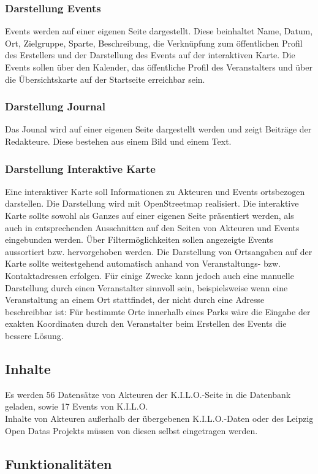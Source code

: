 \documentclass{swp}
\begin{document}
\subsubsection{Darstellung Events}
Events werden auf einer eigenen Seite dargestellt. Diese beinhaltet Name, Datum, Ort, Zielgruppe, Sparte, Beschreibung, die Verkn\"upfung zum \"offentlichen Profil des Erstellers und der Darstellung des Events auf der interaktiven Karte. Die Events sollen \"uber den Kalender, das \"offentliche Profil des Veranstalters und \"uber die \"Ubersichtskarte auf der Startseite erreichbar sein.
\subsubsection{Darstellung Journal}
Das Jounal wird auf einer eigenen Seite dargestellt werden und zeigt Beitr\"age der Redakteure. Diese bestehen aus einem Bild und einem Text.
\subsubsection{Darstellung Interaktive Karte}
Eine interaktiver Karte soll Informationen zu Akteuren und Events ortsbezogen darstellen. Die Darstellung wird mit OpenStreetmap realisiert. Die interaktive Karte sollte sowohl als Ganzes auf einer eigenen Seite pr\"asentiert werden, als auch in entsprechenden Ausschnitten auf den Seiten von Akteuren und Events eingebunden werden. \"Uber Filterm\"oglichkeiten sollen angezeigte Events aussortiert bzw. hervorgehoben werden. Die Darstellung von Ortsangaben auf der Karte sollte weitestgehend automatisch anhand von Veranstaltungs- bzw. Kontaktadressen erfolgen. F\"ur einige Zwecke kann jedoch auch eine manuelle Darstellung durch einen Veranstalter sinnvoll sein, beispielsweise wenn eine Veranstaltung an einem Ort stattfindet, der nicht durch eine Adresse beschreibbar ist: F\"ur bestimmte Orte innerhalb eines Parks w\"are die Eingabe der exakten Koordinaten durch den Veranstalter beim Erstellen des Events die bessere L\"osung. 
\subsection{Inhalte}
Es werden 56 Datens\"atze von Akteuren der K.I.L.O.-Seite in die Datenbank geladen, sowie 17 Events von K.I.L.O.\\
Inhalte von Akteuren au{\ss}erhalb der \"ubergebenen K.I.L.O.-Daten oder des Leipzig Open Datas Projekts m\"ussen von diesen selbst eingetragen werden. 
\subsection{Funktionalit\"aten}
\end{document}
